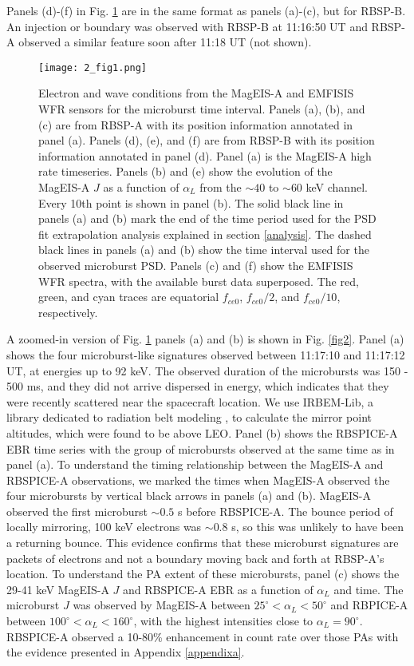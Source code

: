 Panels (d)-(f) in Fig. \ref{fig1} are in the same format as panels (a)-(c), but for RBSP-B. An injection or boundary was observed with RBSP-B at 11:16:50 UT and RBSP-A observed a similar feature soon after 11:18 UT (not shown).

\begin{figure}
\texttt{[image: 2\_fig1.png]}
\caption{Electron and wave conditions from the MagEIS-A and EMFISIS WFR sensors for the microburst time interval. Panels (a), (b), and (c) are from RBSP-A with its position information annotated in panel (a). Panels (d), (e), and (f) are from RBSP-B with its position information annotated in panel (d). Panel (a) is the MagEIS-A high rate timeseries. Panels (b) and (e) show the evolution of the MagEIS-A $J$ as a function of $\alpha_{L}$ from the ${\sim} 40$ to ${\sim} 60$ keV channel. Every 10th point is shown in panel (b). The solid black line in panels (a) and (b) mark the end of the time period used for the PSD fit extrapolation analysis explained in section \ref{analysis}. The dashed black lines in panels (a) and (b) show the time interval used for the observed microburst PSD. Panels (c) and (f) show the EMFISIS WFR spectra, with the available burst data superposed. The red, green, and cyan traces are equatorial $f_{ce0}$, $f_{ce0}/2$, and $f_{ce0}/10$, respectively. }
\label{fig1}
\end{figure}

A zoomed-in version of Fig. \ref{fig1} panels (a) and (b) is shown in Fig. \ref{fig2}. Panel (a) shows the four microburst-like signatures observed between 11:17:10 and 11:17:12 UT, at energies up to 92 keV. The observed duration of the microbursts was 150 - 500 ms, and they did not arrive dispersed in energy, which indicates that they were recently scattered near the spacecraft location. We use IRBEM-Lib, a library dedicated to radiation belt modeling \citep{irbem}, to calculate the mirror point altitudes, which were found to be above LEO. Panel (b) shows the RBSPICE-A EBR time series with the group of microbursts observed at the same time as in panel (a). To understand the timing relationship between the MagEIS-A and RBSPICE-A observations, we marked the times when MagEIS-A observed the four microbursts by vertical black arrows in panels (a) and (b). MagEIS-A observed the first microburst $\sim 0.5$ s before RBSPICE-A. The bounce period of locally mirroring, 100 keV electrons was $\sim 0.8$ s, so this was unlikely to have been a returning bounce. This evidence confirms that these microburst signatures are packets of electrons and not a boundary moving back and forth at RBSP-A's location. To understand the PA extent of these microbursts, panel (c) shows the 29-41 keV MagEIS-A $J$ and RBSPICE-A EBR as a function of $\alpha_{L}$ and time. The microburst $J$ was observed by MagEIS-A between $25^\circ < \alpha_L < 50^\circ$ and RBPICE-A between $100^\circ < \alpha_L < 160^\circ$, with the highest intensities close to $\alpha_L = 90^\circ$. RBSPICE-A observed a 10-80\% enhancement in count rate over those PAs with the evidence presented in Appendix \ref{appendixa}.

